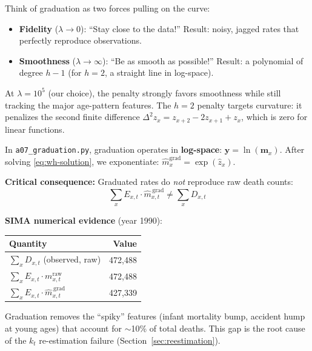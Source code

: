\documentclass[11pt,a4paper]{article}
\theoremstyle{definition}
\begin{document}
\begin{intuition}
Think of graduation as two forces pulling on the curve:
\begin{itemize}
  \item \textbf{Fidelity} ($\lambda \to 0$): ``Stay close to the data!''
    Result: noisy, jagged rates that perfectly reproduce observations.
  \item \textbf{Smoothness} ($\lambda \to \infty$): ``Be as smooth as possible!''
    Result: a polynomial of degree $h-1$ (for $h=2$, a straight line in log-space).
\end{itemize}
At $\lambda = 10^5$ (our choice), the penalty strongly favors smoothness
while still tracking the major age-pattern features. The $h=2$ penalty
targets curvature: it penalizes the second finite difference
$\Delta^2 z_x = z_{x+2} - 2z_{x+1} + z_x$, which is zero for
linear functions.
\end{intuition}

\begin{application}
In \texttt{a07\_graduation.py}, graduation operates in \textbf{log-space}:
$\bm{y} = \ln(\bm{m}_x)$. After solving \eqref{eq:wh-solution},
we exponentiate: $\hat{m}_x^{\text{grad}} = \exp(\hat{z}_x)$.

\textbf{Critical consequence:} Graduated rates do \emph{not} reproduce raw death counts:
\[
  \sum_x E_{x,t} \cdot \hat{m}_{x,t}^{\,\text{grad}} \neq \sum_x D_{x,t}
\]

\textbf{SIMA numerical evidence} (year 1990):
\begin{center}
\begin{tabular}{lr}
\toprule
Quantity & Value \\
\midrule
$\sum_x D_{x,t}$ (observed, raw) & 472{,}488 \\
$\sum_x E_{x,t} \cdot m_{x,t}^{\text{raw}}$ & 472{,}488 \\
$\sum_x E_{x,t} \cdot \hat{m}_{x,t}^{\,\text{grad}}$ & 427{,}339 \\
\bottomrule
\end{tabular}
\end{center}

Graduation removes the ``spiky'' features (infant mortality bump,
accident hump at young ages) that account for $\sim$10\% of total deaths.
This gap is the root cause of the $k_t$ re-estimation failure
(Section~\ref{sec:reestimation}).
\end{application}
\end{document}
